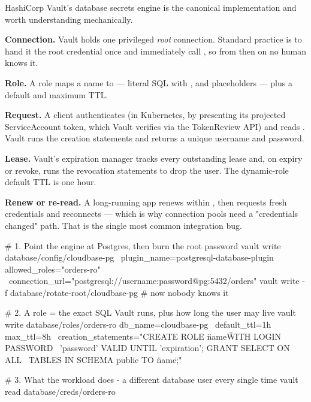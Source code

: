  HashiCorp Vault's database secrets engine is the canonical implementation and worth understanding mechanically.

\begin{wbitem}
  \item \textbf{Connection.} Vault holds one privileged \emph{root} connection. Standard practice is to hand it the root credential once and immediately call , so from then on no human knows it.
  \item \textbf{Role.} A role maps a name to  --- literal SQL with ,  and  placeholders --- plus a default and maximum TTL.
  \item \textbf{Request.} A client authenticates (in Kubernetes, by presenting its projected ServiceAccount token, which Vault verifies via the TokenReview API) and reads . Vault runs the creation statements and returns a unique username and password.
  \item \textbf{Lease.} Vault's expiration manager tracks every outstanding lease and, on expiry or revoke, runs the revocation statements to drop the user. The dynamic-role default TTL is one hour.
  \item \textbf{Renew or re-read.} A long-running app renews within , then requests fresh credentials and reconnects --- which is why connection pools need a "credentials changed" path. That is the single most common integration bug.
\end{wbitem}

\begin{bashbox}
# 1. Point the engine at Postgres, then burn the root password
vault write database/config/cloudbase-pg \
  plugin_name=postgresql-database-plugin allowed_roles="orders-ro" \
  connection_url="postgresql://{{username}}:{{password}}@pg:5432/orders"
vault write -f database/rotate-root/cloudbase-pg   # now nobody knows it

# 2. A role = the exact SQL Vault runs, plus how long the user may live
vault write database/roles/orders-ro db_name=cloudbase-pg \
  default_ttl=1h max_ttl=8h \
  creation_statements="CREATE ROLE \"{{name}}\" WITH LOGIN PASSWORD \
    '{{password}}' VALID UNTIL '{{expiration}}'; GRANT SELECT ON ALL \
    TABLES IN SCHEMA public TO \"{{name}}\";"

# 3. What the workload does - a different database user every single time
vault read database/creds/orders-ro
\end{bashbox}

